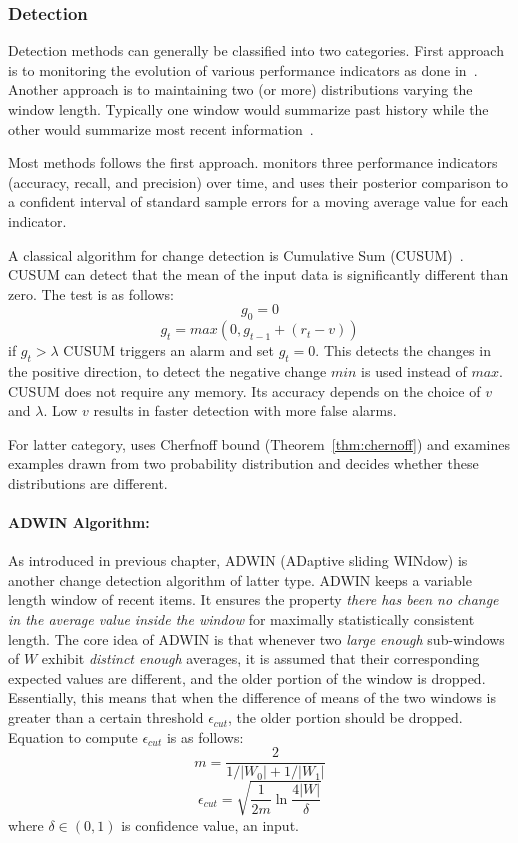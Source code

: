 \documentclass[a4paper, 11pt, oneside]{book}
\begin{document}
\subsubsection{Detection}
Detection methods can generally be classified into two categories. First approach is to monitoring the evolution of various performance indicators as done in~\cite{klinkenberg98:changedetection, zeira04:changedetection}. Another approach is to maintaining two (or more) distributions varying the window length. Typically one window would summarize past history while the other would summarize most recent information~\cite{kifer04:condrift}.

Most methods follows the first approach. \cite{klinkenberg98:changedetection} monitors three performance indicators (accuracy, recall, and precision) over time, and uses their posterior comparison to a confident interval of standard sample errors for a moving average value for each indicator.

A classical algorithm for change detection is Cumulative Sum (CUSUM)~\cite{page54:cusum}. CUSUM can detect that the mean of the input data is significantly different than zero. The test is as follows:
\[
    g_0 = 0 
\]\[
    g_t = max (0, g_{t-1} + (r_t - v))
\]
if $g_t > \lambda$ CUSUM triggers an alarm and set $g_t = 0$. This detects the changes in the positive direction, to detect the negative change $min$ is used instead of $max$. CUSUM does not require any memory. Its accuracy depends on the choice of $v$ and $\lambda$. Low $v$ results in faster detection with more false alarms.

For latter category, \cite{kifer04:condrift} uses Cherfnoff bound (Theorem~\ref{thm:chernoff}) and examines examples drawn from two probability distribution and decides whether these distributions are different.

\paragraph{ADWIN Algorithm:} As introduced in previous chapter, ADWIN (ADaptive sliding WINdow) is another change detection algorithm of latter type. ADWIN keeps a variable length window of recent items. It ensures the property {\it there has been no change in the average value inside the window} for maximally statistically consistent length. The core idea of ADWIN is that whenever two {\it large enough} sub-windows of $W$ exhibit {\it distinct enough} averages, it is assumed that their corresponding expected values are different, and the older portion of the window is dropped. Essentially, this means that when the difference of means of the two windows is greater than a certain threshold $\epsilon_{cut}$, the older portion should be dropped. Equation to compute $\epsilon_{cut}$ is as follows:
\[
    m = \frac{2}{1/|W_0| + 1/|W_1|}
\]\[
    \epsilon_{cut} = \sqrt{\frac{1}{2m} \ln \frac{4 |W|}{\delta}}
\]
where $\delta \in (0, 1)$ is confidence value, an input.
\end{document}

